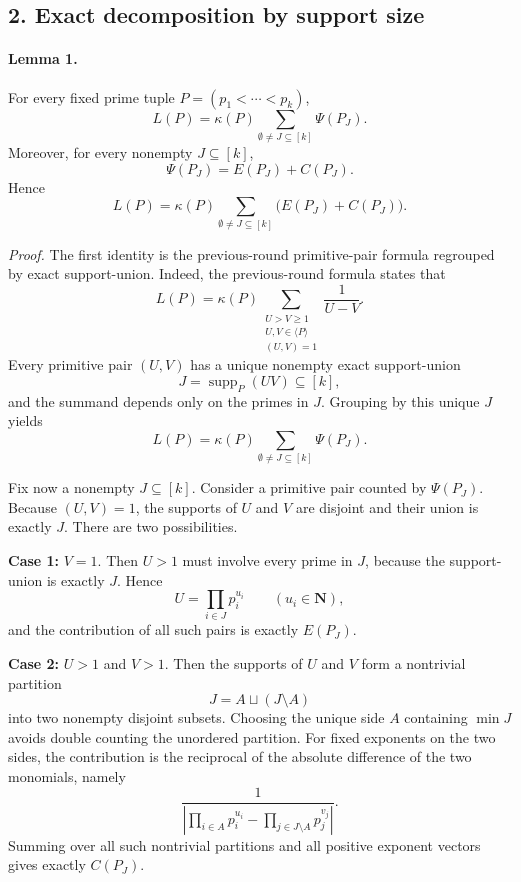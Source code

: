\subsection*{2. Exact decomposition by support size}

\paragraph{Lemma 1.}
For every fixed prime tuple \(P=(p_1<\cdots<p_k)\),
\[
L(P)=\kappa(P)\sum_{\emptyset\neq J\subseteq [k]}\Psi(P_J).
\]
Moreover, for every nonempty \(J\subseteq [k]\),
\[
\Psi(P_J)=E(P_J)+C(P_J).
\]
Hence
\[
L(P)=\kappa(P)\sum_{\emptyset\neq J\subseteq [k]}\bigl(E(P_J)+C(P_J)\bigr).
\tag{2.1}
\]

\emph{Proof.}
The first identity is the previous-round primitive-pair formula regrouped by exact support-union.
Indeed, the previous-round formula states that
\[
L(P)=\kappa(P)
\sum_{\substack{U>V\ge 1\\ U,V\in\langle P\rangle\\ (U,V)=1}}
\frac{1}{U-V}.
\]
Every primitive pair \((U,V)\) has a unique nonempty exact support-union
\[
J=\operatorname{supp}_P(UV)\subseteq [k],
\]
and the summand depends only on the primes in \(J\). Grouping by this unique \(J\) yields
\[
L(P)=\kappa(P)\sum_{\emptyset\neq J\subseteq [k]}\Psi(P_J).
\]

Fix now a nonempty \(J\subseteq [k]\). Consider a primitive pair counted by \(\Psi(P_J)\).
Because \((U,V)=1\), the supports of \(U\) and \(V\) are disjoint and their union is exactly \(J\).
There are two possibilities.

\smallskip
\noindent\textbf{Case 1:} \(V=1\).
Then \(U>1\) must involve every prime in \(J\), because the support-union is exactly \(J\). Hence
\[
U=\prod_{i\in J}p_i^{u_i}
\qquad (u_i\in\mathbf N),
\]
and the contribution of all such pairs is exactly \(E(P_J)\).

\smallskip
\noindent\textbf{Case 2:} \(U>1\) and \(V>1\).
Then the supports of \(U\) and \(V\) form a nontrivial partition
\[
J=A\sqcup (J\setminus A)
\]
into two nonempty disjoint subsets. Choosing the unique side \(A\) containing \(\min J\) avoids double counting the unordered partition. For fixed exponents on the two sides, the contribution is the reciprocal of the absolute difference of the two monomials, namely
\[
\frac{1}{\left|\prod_{i\in A}p_i^{u_i}-\prod_{j\in J\setminus A}p_j^{v_j}\right|}.
\]
Summing over all such nontrivial partitions and all positive exponent vectors gives exactly \(C(P_J)\).

